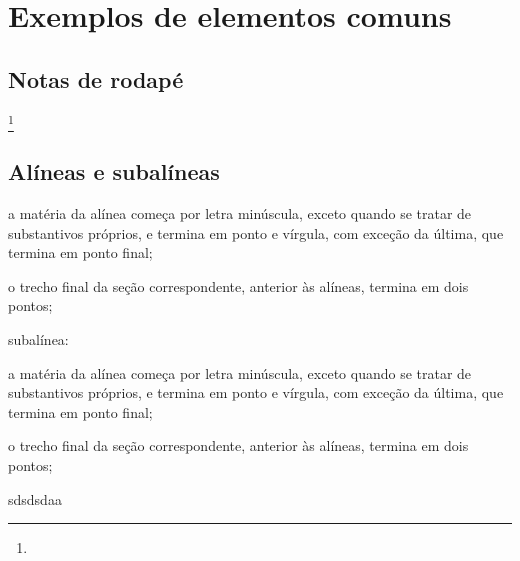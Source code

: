 \chapter{Exemplos de elementos comuns}
\section{Notas de rodapé}
  \lipsum[10]\footnote{\lipsum*[11]}

\section{Alíneas e subalíneas}
  \lipsum[12]
  \begin{alinea}
    \item a matéria da alínea começa por letra minúscula, exceto quando se tratar de substantivos próprios, e termina em ponto e vírgula, com exceção da última, que termina em ponto final; 
    \item o trecho final da seção correspondente, anterior às alíneas, termina em
    dois pontos;
    \item subalínea: 
    \begin{subalinea}
      \item a matéria da alínea começa por letra minúscula, exceto quando se tratar de     substantivos próprios, e termina em ponto e vírgula, com exceção da última, que termina em ponto final; 
      \item o trecho final da seção correspondente, anterior às alíneas, termina em
      dois pontos;
    \end{subalinea}
    \item sdsdsdaa
  \end{alinea}
  
  \lipsum[13]


